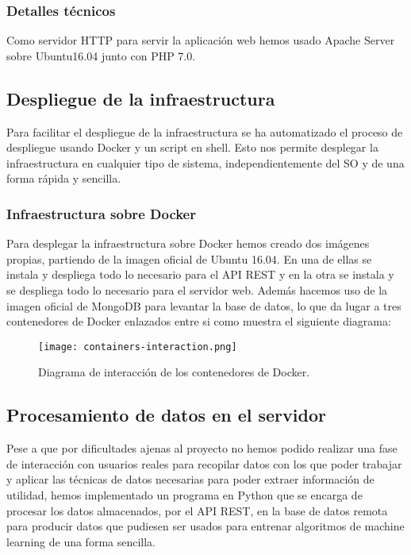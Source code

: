 \subsubsection{Detalles técnicos}
Como servidor HTTP para servir la aplicación web hemos usado Apache Server sobre Ubuntu16.04 junto con PHP 7.0.

\subsection{Despliegue de la infraestructura}

Para facilitar el despliegue de la infraestructura se ha automatizado el proceso de despliegue usando Docker y un script en shell. Esto nos permite desplegar la infraestructura en cualquier tipo de sistema, independientemente del SO y de una forma rápida y sencilla.

\subsubsection{Infraestructura sobre Docker}
Para desplegar la infraestructura sobre Docker hemos creado dos imágenes propias, partiendo de la imagen oficial de Ubuntu 16.04. En una de ellas se instala y despliega todo lo necesario para el API REST y en la otra se instala y se despliega todo lo necesario para el servidor web. Además hacemos uso de la imagen oficial de MongoDB para levantar la base de datos, lo que da lugar a tres contenedores de Docker enlazados entre si como muestra el siguiente diagrama:

\begin{figure}[H]
  \centering
  \texttt{[image: containers-interaction.png]}
  \caption{Diagrama de interacción de los contenedores de Docker.}
\end{figure}

\subsection{Procesamiento de datos en el servidor}

Pese a que por dificultades ajenas al proyecto no hemos podido realizar una fase de interacción con usuarios reales para recopilar datos con los que poder trabajar y aplicar las técnicas de datos necesarias para poder extraer información de utilidad, hemos implementado un programa en Python que se encarga de procesar los datos almacenados, por el API REST, en la base de datos remota para producir datos que pudiesen ser usados para entrenar algoritmos de machine learning de una forma sencilla.
\newpage

